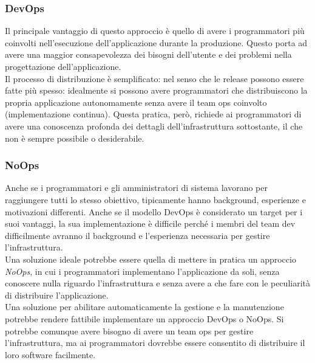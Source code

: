 \documentclass{article}
\begin{document}
\subsubsection{DevOps}
Il principale vantaggio di questo approccio è quello di avere i programmatori più coinvolti nell'esecuzione dell'applicazione durante la produzione. Questo porta ad avere una maggior consapevolezza dei bisogni dell'utente e dei problemi nella progettazione dell'applicazione. \\
Il processo di distribuzione è semplificato: nel senso che le release possono essere fatte più spesso: idealmente si possono avere programmatori che distribuiscono la propria applicazione autonomamente senza avere il team ops coinvolto (implementazione continua). Questa pratica, però, richiede ai programmatori di avere una conoscenza profonda dei dettagli dell'infrastruttura sottostante, il che non è sempre possibile o desiderabile.

\subsubsection{NoOps}
Anche se i programmatori e gli amministratori di sistema lavorano per raggiungere tutti lo stesso obiettivo, tipicamente hanno background, esperienze e motivazioni differenti. Anche se il modello DevOps è considerato un target per i suoi vantaggi, la sua implementazione è difficile perché i membri del team dev difficilmente avranno il background e l'esperienza necessaria per gestire l'infrastruttura. \\
Una soluzione ideale potrebbe essere quella di mettere in pratica un approccio \textit{NoOps}, in cui i programmatori implementano l'applicazione da soli, senza conoscere nulla riguardo l'infrastruttura e senza avere a che fare con le peculiarità di distribuire l'applicazione. \\
Una soluzione per abilitare automaticamente la gestione e la manutenzione potrebbe rendere fattibile implementare un approccio DevOps o NoOps. Si potrebbe comunque avere bisogno di avere un team ops per gestire l'infrastruttura, ma ai programmatori dovrebbe essere consentito di distribuire il loro software facilmente.
\end{document}
